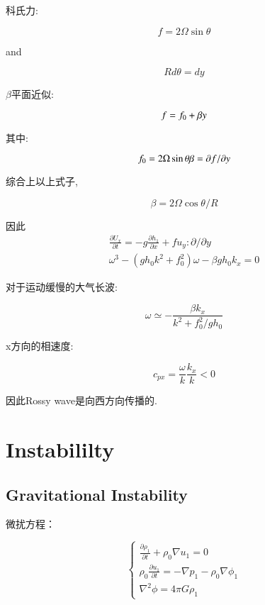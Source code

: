 \documentclass[fontset=windows]{report}
\begin{document}
科氏力:

\[f=2\Omega\sin \theta\]

and

\[Rd\theta=dy\]

\(\beta\)平面近似:

\[f=f_0+\beta y\\\]

其中:

\[f_0=2\Omega\sin \theta\\
\beta = \partial f/\partial y\]

综合上以上式子,

\[\beta = 2\Omega \cos \theta/R\]

因此
\begin{equation}
  \begin{array}{l}
    \frac{\partial U_{x}}{\partial t}=-g \frac{\partial h_{1}}{\partial x}+f u_{y}: \partial / \partial y 
    \\\omega^{3}-\left(g h_{0} k^{2}+f_{0}^{2}\right) \omega-\beta g h_{0} k_{x}=0
  \end{array}
\end{equation}

对于运动缓慢的大气长波:

\[\omega\simeq-\frac{\beta k_x}{k^2+f^2_0/gh_0}\]

x方向的相速度:

\[c_{px}=\frac \omega k \frac {k_x} k<0\]

因此Rossy wave是向西方向传播的.



\chapter{Instabililty}

\section{Gravitational Instability}

微扰方程：

\begin{equation}
     \begin{cases}
        \frac{\partial \rho_1}{\partial t}+\rho_0\nabla u_1=0\\
         \rho_0\frac{\partial u_1}{\partial t}=-\nabla p_1-\rho_0\nabla \phi_1 \\ 
         \nabla^2\phi=4\pi G\rho_1
     \end{cases}
 \end{equation}
\end{document}
